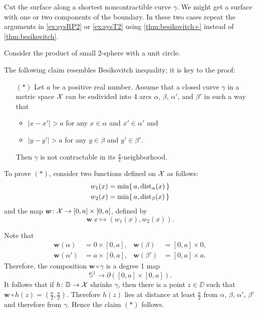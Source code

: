  Cut the surface along a shortest noncontractible curve $\gamma$. 
We might get a surface with one or two components of the boundary.
In these two cases repeat the arguments in \ref{ex:sysRP2} or \ref{ex:sysT2} using \ref{thm:besikovitch+} instead of \ref{thm:besikovitch}.


 Consider the product of small 2-sphere with a unit circle.

The following claim resembles Besikovitch inequality;
it is key to the proof:
\begin{itemize}
 \item[$({*})$] Let $a$ be a positive real number.
 Assume that a closed curve $\gamma$ in a metric space $\mathcal{X}$ can be sudivided into 4 arcs $\alpha$, $\beta$, $\alpha'$, and $\beta'$ in such a way that 
 \begin{itemize}
 \item $|x-x'|>a$ for any $x\in\alpha$ and $x'\in \alpha'$
 and
 \item $|y-y'|>a$ for any $y\in\beta$ and $y'\in \beta'$.
 \end{itemize}
 Then $\gamma$ is not contractable in its $\tfrac a2$-neighborhood.
\end{itemize}

To prove $({*})$, consider two functions defined on $\mathcal{X}$ as follows:
\begin{align*}
w_1(x)&=\min \{\,a,\mathrm{dist}_{\alpha}(x)\,\}
\\
w_2(x)&=\min \{\,a,\mathrm{dist}_{\beta}(x)\,\}
\end{align*}
and the map $\bm{w}\colon\mathcal{X}\to [0,a]\times[0,a]$, defined by
\[\bm{w}\:x\mapsto(w_1(x),w_2(x)).\]

Note that 
\begin{align*}
\bm{w}(\alpha)&=0\times [0,a],
&
\bm{w}(\beta)&=[0,a]\times 0,
\\
\bm{w}(\alpha')&=a\times [0,a],
&
\bm{w}(\beta')&=[0,a]\times a.
\end{align*} 
Therefore, the composition $\bm{w}\circ\gamma$ is a degree 1 map 
\[\mathbb{S}^1\to \partial([0,a]\times[0,a]).\] 
It follows that if $h\colon\mathbb{D}\to \mathcal{X}$ shrinks $\gamma$, then there is a point $z\in\DD$ such that 
$\bm{w}\circ h(z)=(\tfrac a2,\tfrac a2)$.
Therefore $h(z)$ lies at distance at least $\tfrac a2$ from $\alpha$, $\beta$, $\alpha'$, $\beta'$
and therefore from $\gamma$.
Hence the claim $({*})$ follows.

\medskip

